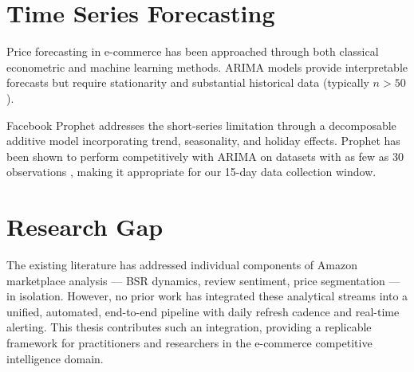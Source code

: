 \section{Time Series Forecasting}

Price forecasting in e-commerce has been approached through both classical econometric
and machine learning methods. ARIMA models \cite{box2015time} provide interpretable
forecasts but require stationarity and substantial historical data (typically $n > 50$).

Facebook Prophet \cite{taylor2018forecasting} addresses the short-series limitation
through a decomposable additive model incorporating trend, seasonality, and holiday
effects. Prophet has been shown to perform competitively with ARIMA on datasets with
as few as 30 observations \cite{triebe2021neuralprophet}, making it appropriate for
our 15-day data collection window.

\section{Research Gap}

The existing literature has addressed individual components of Amazon marketplace
analysis — BSR dynamics, review sentiment, price segmentation — in isolation. However,
no prior work has integrated these analytical streams into a unified, automated,
end-to-end pipeline with daily refresh cadence and real-time alerting. This thesis
contributes such an integration, providing a replicable framework for practitioners
and researchers in the e-commerce competitive intelligence domain.
